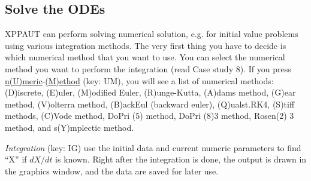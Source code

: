 \subsection{Solve the ODEs}
\label{sec:solve-odes-xppaut}

XPPAUT can perform solving numerical solution, e.g. for initial value
problems using various integration methods.  The very first thing you
have to decide is which numerical method that you want to use. You can
select the numerical method you want to perform the integration (read
Case study 8). If you press \underline{n(U)meric}-\underline{(M)ethod}
(key: UM), you will see a list of numerical methods: (D)iscrete,
(E)uler, (M)odified Euler, (R)unge-Kutta, (A)dams method, (G)ear
method, (V)olterra method, (B)ackEul (backward euler), (Q)ualst.RK4,
(S)tiff methods, (C)Vode method, DoPri (5) method, DoPri (8)3 method,
Rosen(2) 3 method, and s(Y)mplectic method.



{\it Integration} (key: IG) use the initial data and current numeric
parameters to find ``X'' if $dX/dt$ is known. Right after the
integration is done, the output is drawn in the graphics window, and
the data are saved for later use.

